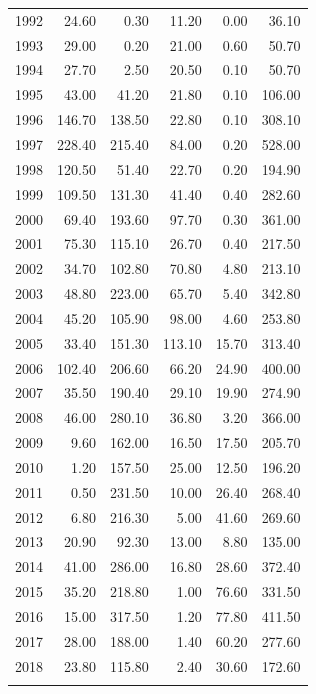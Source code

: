 \documentclass[12pt,]{article}
\begin{document}
\begin{longtable}{rrrrrr}
  1992 & 24.60 & 0.30 & 11.20 & 0.00 & 36.10 \\ 
  1993 & 29.00 & 0.20 & 21.00 & 0.60 & 50.70 \\ 
  1994 & 27.70 & 2.50 & 20.50 & 0.10 & 50.70 \\ 
  1995 & 43.00 & 41.20 & 21.80 & 0.10 & 106.00 \\ 
  1996 & 146.70 & 138.50 & 22.80 & 0.10 & 308.10 \\ 
  1997 & 228.40 & 215.40 & 84.00 & 0.20 & 528.00 \\ 
  1998 & 120.50 & 51.40 & 22.70 & 0.20 & 194.90 \\ 
  1999 & 109.50 & 131.30 & 41.40 & 0.40 & 282.60 \\ 
  2000 & 69.40 & 193.60 & 97.70 & 0.30 & 361.00 \\ 
  2001 & 75.30 & 115.10 & 26.70 & 0.40 & 217.50 \\ 
  2002 & 34.70 & 102.80 & 70.80 & 4.80 & 213.10 \\ 
  2003 & 48.80 & 223.00 & 65.70 & 5.40 & 342.80 \\ 
  2004 & 45.20 & 105.90 & 98.00 & 4.60 & 253.80 \\ 
  2005 & 33.40 & 151.30 & 113.10 & 15.70 & 313.40 \\ 
  2006 & 102.40 & 206.60 & 66.20 & 24.90 & 400.00 \\ 
  2007 & 35.50 & 190.40 & 29.10 & 19.90 & 274.90 \\ 
  2008 & 46.00 & 280.10 & 36.80 & 3.20 & 366.00 \\ 
  2009 & 9.60 & 162.00 & 16.50 & 17.50 & 205.70 \\ 
  2010 & 1.20 & 157.50 & 25.00 & 12.50 & 196.20 \\ 
  2011 & 0.50 & 231.50 & 10.00 & 26.40 & 268.40 \\ 
  2012 & 6.80 & 216.30 & 5.00 & 41.60 & 269.60 \\ 
  2013 & 20.90 & 92.30 & 13.00 & 8.80 & 135.00 \\ 
  2014 & 41.00 & 286.00 & 16.80 & 28.60 & 372.40 \\ 
  2015 & 35.20 & 218.80 & 1.00 & 76.60 & 331.50 \\ 
  2016 & 15.00 & 317.50 & 1.20 & 77.80 & 411.50 \\ 
  2017 & 28.00 & 188.00 & 1.40 & 60.20 & 277.60 \\ 
  2018 & 23.80 & 115.80 & 2.40 & 30.60 & 172.60 \\ 
   \hline
\hline
\label{tab:Reconstructed_Landings_byState}
\end{longtable}
\end{document}
